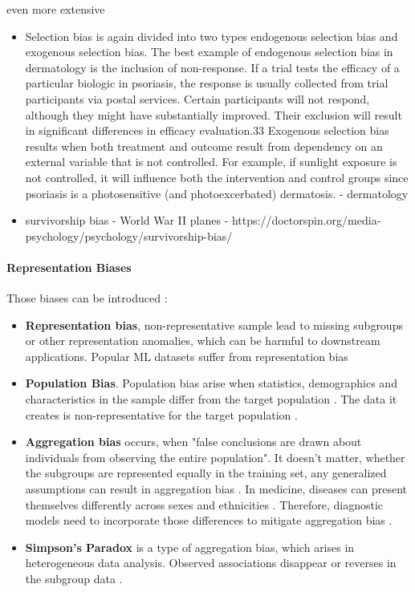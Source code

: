 \begin{refsection}
		even more extensive
		\begin{itemize}
			\item Selection bias is again divided into two types endogenous selection bias and exogenous selection bias. The best example of endogenous selection bias in dermatology is the inclusion of non-response. If a trial tests the efficacy of a particular biologic in psoriasis, the response is usually collected from trial participants via postal services. Certain participants will not respond, although they might have substantially improved. Their exclusion will result in significant differences in efficacy evaluation.33
			Exogenous selection bias results when both treatment and outcome result from dependency on an external variable that is not controlled. For example, if sunlight exposure is not controlled, it will influence both the intervention and control groups since psoriasis is a photosensitive (and photoexcerbated) dermatosis. \autocite{Chakraborty_2024} - dermatology
			
			
			\item survivorship bias - World War II planes \autocite{Silfwer_2017} - https://doctorspin.org/media-psychology/psychology/survivorship-bias/
		\end{itemize}
		
		\rawcitationend
		
		\paragraph{Representation Biases}
		
		Those biases can be introduced :
		\begin{itemize}
			\item \textbf{Representation bias}, non-representative sample lead to missing subgroups or other representation anomalies, which can be harmful to downstream applications. Popular \gls{ML} datasets suffer from representation bias \autocites{Mehrabi_2021}{M142_Shankar_2017}
			\item \textbf{Population Bias}. Population bias arise when statistics, demographics and characteristics in the sample differ from the target population \autocite{M120_Olteanu_2019}. The data it creates is non-representative for the target population \autocite{Mehrabi_2021}.
			\item \textbf{Aggregation bias} occurs, when "false conclusions are drawn about individuals from observing the entire population". It doesn't matter, whether the subgroups are represented equally in the training set, any generalized assumptions can result in aggregation bias \autocite{Mehrabi_2021}. In medicine, diseases can present themselves differently across sexes and ethnicities \autocite{M144_Suresh_2021}. Therefore, diagnostic models need to incorporate those differences to mitigate aggregation bias \autocite{Mehrabi_2021}.
			\item \textbf{Simpson's Paradox} is a type of aggregation bias, which arises in heterogeneous data analysis. Observed associations disappear or reverses in the subgroup data \autocite{Mehrabi_2021}.
		\end{itemize}
		

\end{refsection}
